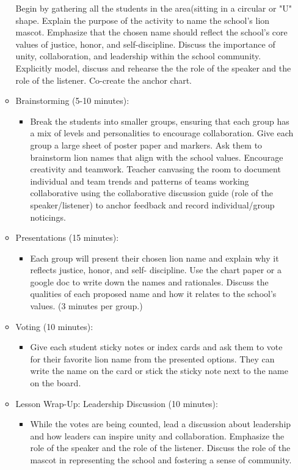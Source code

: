 \documentclass[14pt, letterpaper, twoside]{article}
\begin{document}
\begin{itemize}
\begin{itemize}
    		Begin by gathering all the students in the area(sitting in a circular or "U" shape. Explain the purpose of the activity to name the school's lion mascot. Emphasize that the chosen name should reflect the school's core values of justice, honor, and self-discipline. Discuss the importance of unity, collaboration, and leadership 			within the school community. Explicitly model, discuss and rehearse the the role of the speaker and the role of the listener. Co-create the anchor chart.
		\item Brainstorming (5-10 minutes):
		\begin{itemize}
    		\item Break the students into smaller groups, ensuring that each group has a mix of levels and 						personalities 		to encourage collaboration. Give each group a large sheet of poster paper and markers. Ask them to brainstorm lion names that align with the school values. Encourage creativity and teamwork. Teacher canvasing the room to document individual and team trends and patterns of teams working collaborative using the collaborative discussion guide (role of the speaker/listener) to anchor feedback and record individual/group noticings.
    		\end{itemize}
    		\item Presentations (15 minutes):
		\begin{itemize}
    		\item Each group will present their chosen lion name and explain why it reflects justice, honor, and self-	discipline. Use the chart paper or a google doc to write down the names and rationales. Discuss the qualities of each proposed name and how it relates to the school's values. (3 minutes per group.)
    		\end{itemize}
		\item Voting (10 minutes):
		\begin{itemize}
    		\item Give each student sticky notes or index cards and ask them to vote for their favorite lion name from the 				presented options. They can write the name on the card or stick the sticky note next to the name on the board.
    		\end{itemize}
		\item Lesson Wrap-Up: Leadership Discussion (10 minutes):
		\begin{itemize}
    		\item While the votes are being counted, lead a discussion about leadership and how leaders can inspire 				unity and collaboration. Emphasize the role of the speaker and the role of the listener. Discuss the role 				of the mascot in representing the school and fostering a sense of community.

\end{itemize}
\end{itemize}
\end{itemize}
\end{document}
